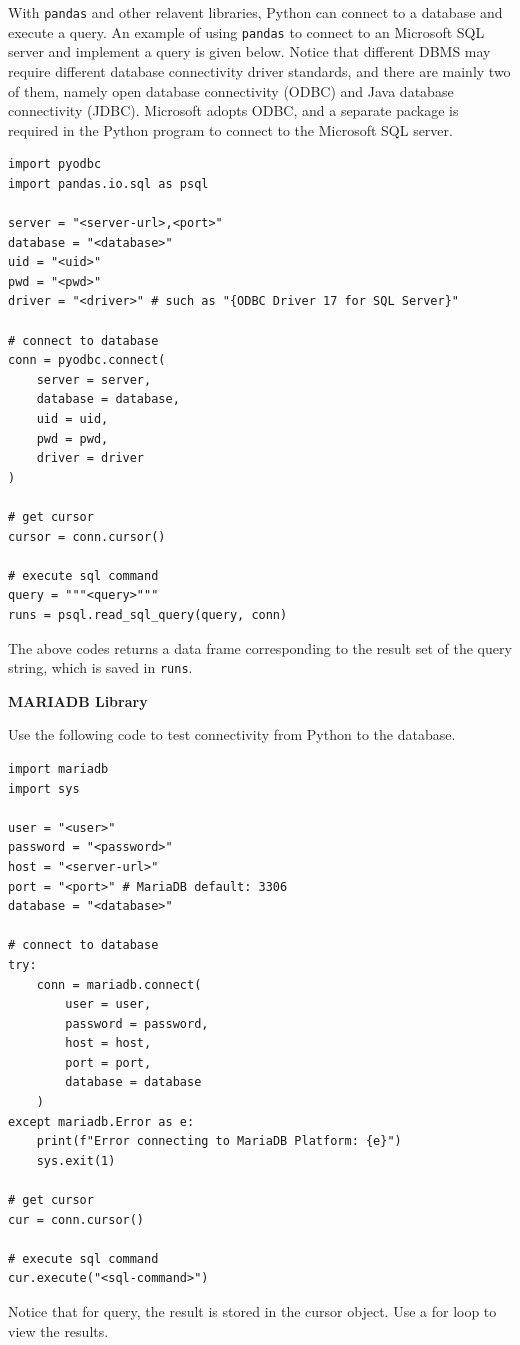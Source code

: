 With \verb|pandas| and other relavent libraries, Python can connect to a database and execute a query. An example of using \verb|pandas| to connect to an Microsoft SQL server and implement a query is given below. Notice that different DBMS may require different database connectivity driver standards, and there are mainly two of them, namely open database connectivity (ODBC) and Java database connectivity (JDBC). Microsoft adopts ODBC, and a separate package is required in the Python program to connect to the Microsoft SQL server.
\begin{lstlisting}
import pyodbc
import pandas.io.sql as psql

server = "<server-url>,<port>"
database = "<database>"
uid = "<uid>"
pwd = "<pwd>"
driver = "<driver>" # such as "{ODBC Driver 17 for SQL Server}"

# connect to database
conn = pyodbc.connect(
	server = server,
	database = database,
	uid = uid,
	pwd = pwd,
	driver = driver
)

# get cursor
cursor = conn.cursor()

# execute sql command
query = """<query>"""
runs = psql.read_sql_query(query, conn)
\end{lstlisting}
The above codes returns a data frame corresponding to the result set of the query string, which is saved in \verb|runs|.

\vspace{0.1in}
\noindent \textbf{MARIADB Library}
\vspace{0.1in}

Use the following code to test connectivity from Python to the database.
\begin{lstlisting}
import mariadb
import sys

user = "<user>"
password = "<password>"
host = "<server-url>"
port = "<port>" # MariaDB default: 3306
database = "<database>"

# connect to database
try:
	conn = mariadb.connect(
		user = user,
		password = password,
		host = host,
		port = port,
		database = database
	)
except mariadb.Error as e:
	print(f"Error connecting to MariaDB Platform: {e}")
	sys.exit(1)

# get cursor
cur = conn.cursor()

# execute sql command
cur.execute("<sql-command>")
\end{lstlisting}
Notice that for query, the result is stored in the cursor object. Use a for loop to view the results.
